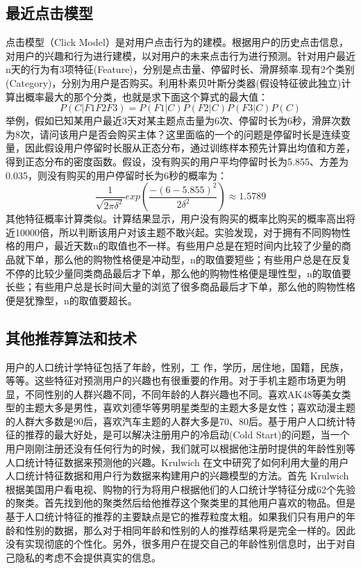 		\subsection{最近点击模型}
		点击模型（Click Model）是对用户点击行为的建模。根据用户的历史点击信息，对用户的兴趣和行为进行建模，以对用户的未来点击行为进行预测。针对用户最近n天的行为有3项特征(Feature)，分别是点击量、停留时长、滑屏频率.现有2个类别(Category)，分别为用户是否购买。利用朴素贝叶斯分类器(假设特征彼此独立)计算出概率最大的那个分类，也就是求下面这个算式的最大值：
		\begin{equation}
			P(C|F1F2F3) = P(F1|C)P(F2|C)P(F3|C)P(C)
			\label{F-Measure}
		\end{equation}
		举例，假如已知某用户最近3天对某主题点击量为6次、停留时长为6秒，滑屏次数为8次，请问该用户是否会购买主体？这里面临的一个的问题是停留时长是连续变量，因此假设用户停留时长服从正态分布，通过训练样本预先计算出均值和方差，得到正态分布的密度函数。假设，没有购买的用户平均停留时长为5.855、方差为0.035，则没有购买的用户停留时长为6秒的概率为：
		\begin{equation}
			\frac{1}{\sqrt{2\pi \delta ^2}}exp\left ( \frac{-(6-5.855)^{2}}{2\delta ^{2}} \right ) \approx 1.5789
			\label{exponent}
		\end{equation}
		其他特征概率计算类似。计算结果显示，用户没有购买的概率比购买的概率高出将近10000倍，所以判断该用户对该主题不敢兴起。实验发现，对于拥有不同购物性格的用户，最近天数n的取值也不一样。有些用户总是在短时间内比较了少量的商品就下单，那么他的购物性格便是冲动型，n的取值要短些；有些用户总是在反复不停的比较少量同类商品最后才下单，那么他的购物性格便是理性型，n的取值要长些；有些用户总是长时间大量的浏览了很多商品最后才下单，那么他的购物性格便是犹豫型，n的取值要超长。

		\subsection{其他推荐算法和技术}
		用户的人口统计学特征包括了年龄，性别，工 作，学历，居住地，国籍，民族，等等。这些特征对预测用户的兴趣也有很重要的作用。对于手机主题市场更为明显，不同性别的人群兴趣不同，不同年龄的人群兴趣也不同。喜欢AK48等美女类型的主题大多是男性，喜欢刘德华等男明星类型的主题大多是女性；喜欢动漫主题的人群大多数是90后，喜欢汽车主题的人群大多是70、80后。基于用户人口统计特征的推荐的最大好处，是可以解决注册用户的冷启动(Cold Start)的问题，当一个用户刚刚注册还没有任何行为的时候，我们就可以根据他注册时提供的年龄性别等人口统计特征数据来预测他的兴趣。Krulwich 在文中\citep{demo-data}研究了如何利用大量的用户人口统计特征数据和用户行为数据来构建用户的兴趣模型的方法。首先 Krulwich 根据美国用户看电视、购物的行为将用户根据他们的人口统计学特征分成62个先验的聚类。首先找到他的聚类然后给他推荐这个聚类里的其他用户喜欢的物品。但是基于人口统计特征的推荐的主要缺点是它的推荐粒度太粗。如果我们只有用户的年龄和性别的数据，那么对于相同年龄和性别的人的推荐结果将是完全一样的。因此没有实现彻底的个性化。另外，很多用户在提交自己的年龄性别信息时，出于对自己隐私的考虑不会提供真实的信息。

